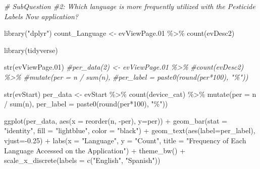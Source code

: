 \documentclass[
]{article}
\newenvironment{Shaded}{\begin{snugshade}}{\end{snugshade}}
\newcommand{\AttributeTok}[1]{\textcolor[rgb]{0.77,0.63,0.00}{#1}}
\newcommand{\CommentTok}[1]{\textcolor[rgb]{0.56,0.35,0.01}{\textit{#1}}}
\newcommand{\DecValTok}[1]{\textcolor[rgb]{0.00,0.00,0.81}{#1}}
\newcommand{\FloatTok}[1]{\textcolor[rgb]{0.00,0.00,0.81}{#1}}
\newcommand{\FunctionTok}[1]{\textcolor[rgb]{0.00,0.00,0.00}{#1}}
\newcommand{\NormalTok}[1]{#1}
\newcommand{\OtherTok}[1]{\textcolor[rgb]{0.56,0.35,0.01}{#1}}
\newcommand{\SpecialCharTok}[1]{\textcolor[rgb]{0.00,0.00,0.00}{#1}}
\newcommand{\StringTok}[1]{\textcolor[rgb]{0.31,0.60,0.02}{#1}}
\begin{document}
\begin{Shaded}
\begin{Highlighting}[]
\CommentTok{\# SubQuestion \#2: Which language is more frequently utilized with the \textquotesingle{}Pesticide Labels Now\textquotesingle{} application? }

\FunctionTok{library}\NormalTok{(}\StringTok{"dplyr"}\NormalTok{)}
\NormalTok{count\_Language }\OtherTok{\textless{}{-}}\NormalTok{ evViewPage}\FloatTok{.01} \SpecialCharTok{\%\textgreater{}\%}
  \FunctionTok{count}\NormalTok{(evDesc2)}

\FunctionTok{library}\NormalTok{(tidyverse)}

\FunctionTok{str}\NormalTok{(evViewPage}\FloatTok{.01}\NormalTok{)}
\CommentTok{\#per\_data(2) \textless{}{-} evViewPage.01 \%\textgreater{}\%}
  \CommentTok{\#count(evDesc2) \%\textgreater{}\% }
  \CommentTok{\#mutate(per = n / sum(n),}
         \CommentTok{\#per\_label = paste0(round(per*100), "\%"))}

\FunctionTok{str}\NormalTok{(evStart)}
\NormalTok{per\_data }\OtherTok{\textless{}{-}}\NormalTok{ evStart }\SpecialCharTok{\%\textgreater{}\%}
  \FunctionTok{count}\NormalTok{(device\_cat) }\SpecialCharTok{\%\textgreater{}\%} 
  \FunctionTok{mutate}\NormalTok{(}\AttributeTok{per =}\NormalTok{ n }\SpecialCharTok{/} \FunctionTok{sum}\NormalTok{(n),}
         \AttributeTok{per\_label =} \FunctionTok{paste0}\NormalTok{(}\FunctionTok{round}\NormalTok{(per}\SpecialCharTok{*}\DecValTok{100}\NormalTok{), }\StringTok{"\%"}\NormalTok{))}

\FunctionTok{ggplot}\NormalTok{(per\_data, }\FunctionTok{aes}\NormalTok{(}\AttributeTok{x =} \FunctionTok{reorder}\NormalTok{(n, }\SpecialCharTok{{-}}\NormalTok{per), }\AttributeTok{y=}\NormalTok{per)) }\SpecialCharTok{+} 
  \FunctionTok{geom\_bar}\NormalTok{(}\AttributeTok{stat =} \StringTok{"identity"}\NormalTok{, }\AttributeTok{fill =} \StringTok{"lightblue"}\NormalTok{, }\AttributeTok{color =} \StringTok{"black"}\NormalTok{) }\SpecialCharTok{+} 
  \FunctionTok{geom\_text}\NormalTok{(}\FunctionTok{aes}\NormalTok{(}\AttributeTok{label=}\NormalTok{per\_label), }\AttributeTok{vjust=}\SpecialCharTok{{-}}\FloatTok{0.25}\NormalTok{) }\SpecialCharTok{+} 
  \FunctionTok{labs}\NormalTok{(}\AttributeTok{x =} \StringTok{"Language"}\NormalTok{, }\AttributeTok{y =} \StringTok{"Count"}\NormalTok{,  }
       \AttributeTok{title =} \StringTok{"Frequency of Each Language Accessed on the Application"}\NormalTok{) }\SpecialCharTok{+} 
  \FunctionTok{theme\_bw}\NormalTok{() }\SpecialCharTok{+} 
  \FunctionTok{scale\_x\_discrete}\NormalTok{(}\AttributeTok{labels =} \FunctionTok{c}\NormalTok{(}\StringTok{"English"}\NormalTok{, }\StringTok{"Spanish"}\NormalTok{))}
\end{Highlighting}
\end{Shaded}
\end{document}
